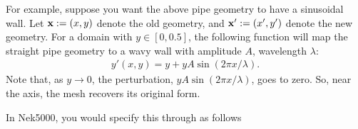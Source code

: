 \documentclass[letterpaper,10pt,english]{sphinxmanual}
\begin{document}
For example, suppose you want the above pipe geometry to have
a sinusoidal wall.  Let \({\bf x} := (x,y)\) denote the old geometry,
and \({\bf x}' := (x',y')\) denote the new geometry.  For a domain
with \(y\in [0,0.5]\), the following function will map the straight
pipe geometry to a wavy wall with amplitude \(A\), wavelength \(\lambda\):
\begin{equation*}
\begin{split}y'(x,y) = y  + y A \sin( 2 \pi x / \lambda ).\end{split}
\end{equation*}
Note that, as \(y \longrightarrow 0\), the perturbation,
\(yA \sin( 2 \pi x / \lambda )\), goes to zero.  So, near the axis,
the mesh recovers its original form.

In Nek5000, you would specify this through  as follows

%
\begin{sphinxVerbatim}[commandchars=\\\{\}]
 
 


  

  
       

             
       

    

\end{sphinxVerbatim}
\end{document}
